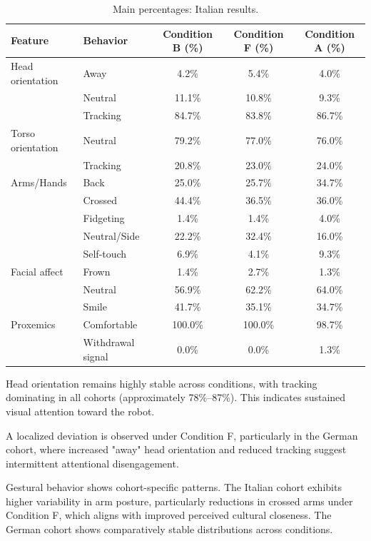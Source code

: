 \begin{table}[!ht]
\centering
\begin{tabular}{llccc}
\toprule
Feature & Behavior & Condition B (\%) & Condition F (\%) & Condition A (\%) \\
\midrule
Head orientation & Away & 4.2\% & 5.4\% & 4.0\% \\
~ & Neutral & 11.1\% & 10.8\% & 9.3\% \\
~ & Tracking & 84.7\% & 83.8\% & 86.7\% \\
\midrule
Torso orientation & Neutral & 79.2\% & 77.0\% & 76.0\% \\
~ & Tracking & 20.8\% & 23.0\% & 24.0\% \\
\midrule
Arms/Hands & Back & 25.0\% & 25.7\% & 34.7\% \\
~ & Crossed & 44.4\% & 36.5\% & 36.0\% \\
~ & Fidgeting & 1.4\% & 1.4\% & 4.0\% \\
~ & Neutral/Side & 22.2\% & 32.4\% & 16.0\% \\
~ & Self-touch & 6.9\% & 4.1\% & 9.3\% \\
\midrule
Facial affect & Frown & 1.4\% & 2.7\% & 1.3\% \\
~ & Neutral & 56.9\% & 62.2\% & 64.0\% \\
~ & Smile & 41.7\% & 35.1\% & 34.7\% \\
\midrule
Proxemics & Comfortable & 100.0\% & 100.0\% & 98.7\% \\
~ & Withdrawal signal & 0.0\% & 0.0\% & 1.3\% \\
\bottomrule
\end{tabular}
\caption{Main percentages: Italian results.}
\label{tab:main_pct_italian}
\end{table}


Head orientation remains highly stable across conditions, with tracking dominating in all cohorts (approximately 78\%--87\%). This indicates sustained visual attention toward the robot.

A localized deviation is observed under Condition F, particularly in the German cohort, where increased "away" head orientation and reduced tracking suggest intermittent attentional disengagement.

Gestural behavior shows cohort-specific patterns. The Italian cohort exhibits higher variability in arm posture, particularly reductions in crossed arms under Condition F, which aligns with improved perceived cultural closeness. The German cohort shows comparatively stable distributions across conditions.

